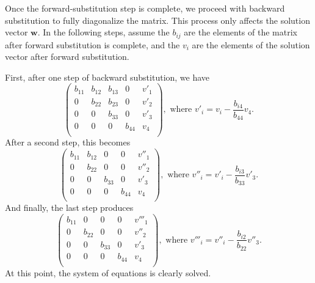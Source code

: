 \documentclass{article}
\begin{document}
        Once the forward-substitution step is complete, we proceed with backward substitution to fully diagonalize the matrix. This process only affects the solution vector $\mathbf{w}$. In the following steps, assume the $b_{ij}$ are the elements of the matrix after forward substitution is complete, and the $v_i$ are the elements of the solution vector after forward substitution.

        First, after one step of backward substitution, we have
        \begin{equation*}
            \begin{pmatrix}
                b_{11} & b_{12}  & b_{13}   & 0      & v'_1 \\
                0      & b_{22}  & b_{23}   & 0      & v'_2 \\
                0      & 0       & b_{33}   & 0      & v'_3 \\
                0      & 0       & 0        & b_{44} & v_4  \\
            \end{pmatrix}, \text{ where }
            v'_i = v_i - \frac{b_{i4}}{b_{44}} v_4 .
        \end{equation*}
        After a second step, this becomes
        \begin{equation*}
            \begin{pmatrix}
                b_{11} & b_{12}  & 0        & 0      & v''_1 \\
                0      & b_{22}  & 0        & 0      & v''_2 \\
                0      & 0       & b_{33}   & 0      & v'_3  \\
                0      & 0       & 0        & b_{44} & v_4   \\
            \end{pmatrix}, \text{ where }
            v''_i = v'_i - \frac{b_{i3}}{b_{33}} v'_3 .
        \end{equation*}
        And finally, the last step produces
        \begin{equation*}
            \begin{pmatrix}
                b_{11} & 0       & 0        & 0      & v'''_1 \\
                0      & b_{22}  & 0        & 0      & v''_2 \\
                0      & 0       & b_{33}   & 0      & v'_3  \\
                0      & 0       & 0        & b_{44} & v_4   \\
            \end{pmatrix}, \text{ where }
            v'''_i = v''_i - \frac{b_{i2}}{b_{22}} v''_3 .
        \end{equation*}
        At this point, the system of equations is clearly solved.
\end{document}
